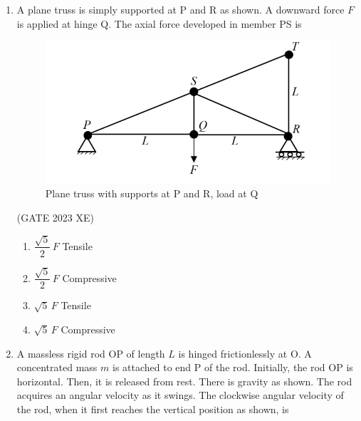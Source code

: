 \documentclass[journal,12pt,onecolumn]{IEEEtran}
\begin{document}
\begin{enumerate}

\item A plane truss is simply supported at P and R as shown. A downward force $F$ is
applied at hinge Q. The axial force developed in member PS is

\begin{figure}[htbp]
\centering
\includegraphics[width=0.75\columnwidth]{figs/C/fig1.png}
\caption{Plane truss with supports at P and R, load at Q}
\label{fig:figs/C/fig1.png}
\end{figure}
\hfill{(GATE 2023 XE)}
\begin{multicols}{2}
\begin{enumerate}
\item $\dfrac{\sqrt{5}}{2}\,F$ Tensile
\item $\dfrac{\sqrt{5}}{2}\,F$ Compressive
\item $\sqrt{5}\,F$ Tensile
\item $\sqrt{5}\,F$ Compressive
\end{enumerate}
\end{multicols}


\item A massless rigid rod OP of length $L$ is hinged frictionlessly at O. A concentrated
mass $m$ is attached to end P of the rod. Initially, the rod OP is horizontal. Then, it
is released from rest. There is gravity as shown. The rod acquires an angular
velocity as it swings. The clockwise angular velocity of the rod, when it first
reaches the vertical position as shown, is


\end{enumerate}
\end{document}
